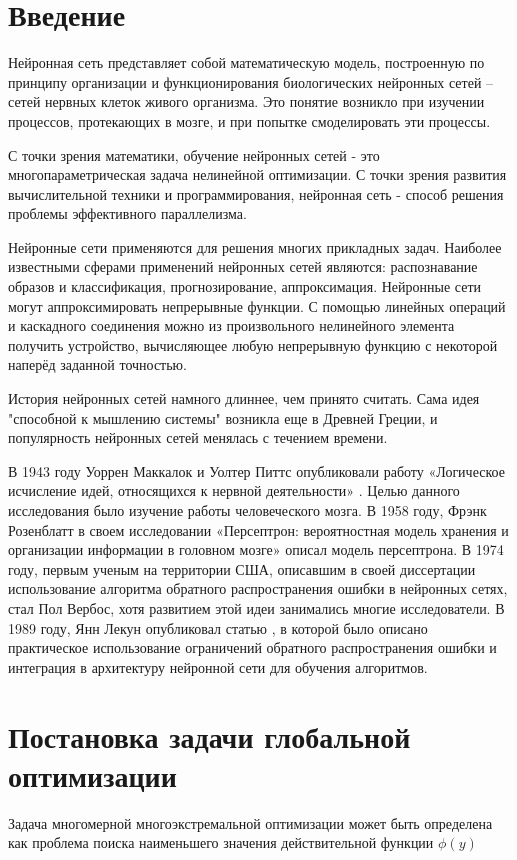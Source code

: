 \documentclass[11pt, oneside, a4paper]{article}
\begin{document}
\bigskip

\section{Введение}

Нейронная сеть представляет собой математическую модель, построенную по принципу организации и функционирования биологических нейронных сетей – сетей нервных клеток живого организма. Это понятие возникло при изучении процессов, протекающих в мозге, и при попытке смоделировать эти процессы. 

С точки зрения математики, обучение нейронных сетей - это многопараметрическая задача нелинейной оптимизации. С точки зрения развития вычислительной техники и программирования, нейронная сеть - способ решения проблемы эффективного параллелизма.

Нейронные сети применяются для решения многих прикладных задач. Наиболее известными сферами применений нейронных сетей являются: распознавание образов и классификация, прогнозирование, аппроксимация.
Нейронные сети могут аппроксимировать непрерывные функции. С помощью линейных операций и каскадного соединения можно из произвольного нелинейного элемента получить устройство, вычисляющее любую непрерывную функцию с некоторой наперёд заданной точностью.

История нейронных сетей намного длиннее, чем принято считать. Сама идея "способной к мышлению системы" возникла еще в Древней Греции, и популярность нейронных сетей менялась с течением времени. 

В 1943 году Уоррен Маккалок и Уолтер Питтс опубликовали работу «Логическое исчисление идей, относящихся к нервной деятельности» \cite{fio_bib3}. Целью данного исследования было изучение работы человеческого мозга. В 1958 году, Фрэнк Розенблатт в своем исследовании «Персептрон: вероятностная модель хранения и организации информации в головном мозге» \cite{fio_bib4} описал модель персептрона. В 1974 году, первым ученым на территории США, описавшим в своей диссертации \cite{fio_bib5} использование алгоритма обратного распространения ошибки в нейронных сетях, стал Пол Вербос, хотя развитием этой идеи занимались многие исследователи. В 1989 году, Янн Лекун опубликовал статью \cite{fio_bib6}, в которой было описано практическое использование ограничений обратного распространения ошибки и интеграция в архитектуру нейронной сети для обучения алгоритмов. 

\section{Постановка задачи глобальной оптимизации}
Задача многомерной многоэкстремальной оптимизации может быть определена как проблема поиска наименьшего значения действительной функции $\phi(y)$
\end{document}
